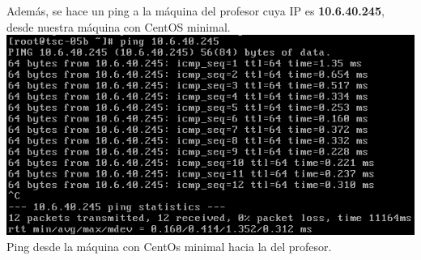 \documentclass[11pt]{article}
\begin{document}
    Además, se hace un ping a la máquina del profesor cuya IP es \textbf{10.6.40.245}, desde nuestra máquina con CentOS minimal.\\
    
\includegraphics[width=.75\linewidth]{screenshots/minimal/ping-to-profe.png}
    \\Ping desde la máquina con CentOs minimal hacia la del profesor.\\    
\end{document}
